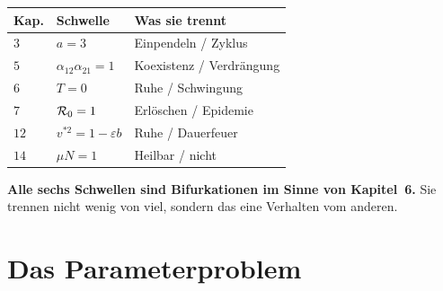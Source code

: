 \begin{merksatz}
\begin{center}
{\small
\renewcommand{\arraystretch}{1.48}
\begin{tabular}{@{}P{1.8cm}P{2.4cm}P{3.8cm}@{}}
\toprule
\textbf{Kap.} & \textbf{Schwelle} & \textbf{Was sie trennt}\\
\midrule
$3$ & $a = 3$ & Einpendeln / Zyklus\\
$5$ & $\alpha_{12}\alpha_{21} = 1$ & Koexistenz / Verdrängung\\
$6$ & $T = 0$ & Ruhe / Schwingung\\
$7$ & $\mathcal{R}_0 = 1$ & Erlöschen / Epidemie\\
$12$ & $v^{*2} = 1-\varepsilon b$ & Ruhe / Dauerfeuer\\
$14$ & $\mu N = 1$ & Heilbar / nicht\\
\bottomrule
\end{tabular}}
\end{center}

\begin{center}
\begin{minipage}{0.9\textwidth}
\textbf{Alle sechs Schwellen sind Bifurkationen im Sinne von Kapitel~6.} Sie trennen nicht wenig von viel, sondern das eine Verhalten vom anderen.
\end{minipage}
\end{center}

\begin{center}
\begin{minipage}{0.88\textwidth}
\end{minipage}
\end{center}
\end{merksatz}

\section{Das Parameterproblem}

